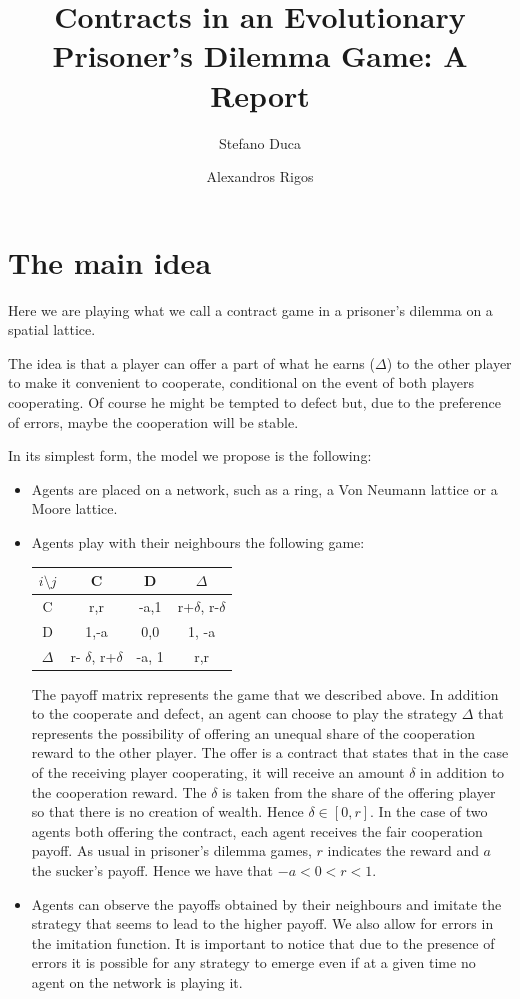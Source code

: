 \documentclass{article}
\author{Stefano Duca \and Alexandros Rigos}
\title{Contracts in an Evolutionary Prisoner's Dilemma Game: A Report}
\begin{document}
\maketitle

\section{The main idea}
Here we are playing what we call a contract game in a prisoner's dilemma on a spatial lattice.

The idea is that a player can offer a part of what he earns ($\Delta$) to the other player to make it convenient to cooperate, conditional on the event of both players cooperating. Of course he might be tempted to defect but, due to the preference of errors, maybe the cooperation will be stable.

In its simplest form, the model we propose is the following:
\begin{itemize}
\item Agents are placed on a network, such as a ring, a Von Neumann lattice or a Moore lattice.

\item Agents play with their neighbours the following game:
\begin{center}
\begin{tabular}{|c|c|c|c|}
\hline 
$i 	\setminus j$ & C & D & $\Delta$ \\ 
\hline 
C & r,r & -a,1 & r+$\delta$, r-$\delta$ \\ 
\hline 
D & 1,-a & 0,0 & 1, -a \\ 
\hline 
$\Delta$ & r- $\delta$, r+$\delta$ & -a, 1 & r,r \\ 
\hline 
\end{tabular} 
\end{center}
The payoff matrix represents the game that we described above.
In addition to the cooperate and defect, an agent can choose to play the strategy $\Delta$ that represents the possibility of offering an unequal share of the cooperation reward to the other player.
The offer is a contract that states that in the case of the receiving player cooperating, it will receive an amount $\delta$ in addition to the cooperation reward.
The $\delta$ is taken from the share of the offering player so that there is no creation of wealth.
Hence $\delta \in \left[0,r \right]$.
In the case of two agents both offering the contract, each agent receives the fair cooperation payoff.
As usual in prisoner's dilemma games, $r$ indicates the reward and $a$ the sucker's payoff. Hence we have that $  -a < 0 < r < 1 $.

\item Agents can observe the payoffs obtained by their neighbours and imitate the strategy that seems to lead to the higher payoff.
We also allow for errors in the imitation function.
It is important to notice that due to the presence of errors it is possible for any strategy to emerge even if at a given time no agent on the network is playing it.
\end{itemize}
\end{document}
